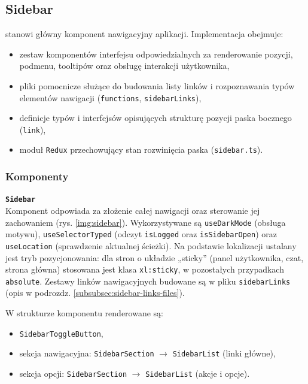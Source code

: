 
\subsection{Sidebar}
\label{subsec:sidebar-frontend}

 stanowi główny komponent nawigacyjny aplikacji.
Implementacja obejmuje:
\begin{itemize}
    \item zestaw komponentów interfejsu odpowiedzialnych za renderowanie pozycji, podmenu, tooltipów oraz obsługę
    interakcji użytkownika,
    \item pliki pomocnicze służące do budowania listy linków i rozpoznawania typów elementów nawigacji
    (\texttt{functions}, \texttt{sidebarLinks}),
    \item definicje typów i interfejsów opisujących strukturę pozycji paska bocznego (\texttt{link}),
    \item moduł \texttt{Redux} przechowujący stan rozwinięcia paska (\texttt{sidebar.ts}).
\end{itemize}

\subsubsection{Komponenty}

\textbf{\texttt{Sidebar}} \\
Komponent odpowiada za złożenie całej nawigacji oraz sterowanie jej zachowaniem (rys. \ref{img:sidebar}).
Wykorzystywane są  \texttt{useDarkMode} (obsługa motywu), \newline \texttt{useSelectorTyped}
(odczyt \texttt{isLogged} oraz \texttt{isSidebarOpen}) oraz \texttt{useLocation} (sprawdzenie aktualnej ścieżki).
Na podstawie lokalizacji ustalany jest tryb pozycjonowania: dla stron o układzie „sticky”
(panel użytkownika, czat, strona główna) stosowana jest klasa \texttt{xl:sticky}, w pozostałych przypadkach \texttt{absolute}.
Zestawy linków nawigacyjnych budowane są w pliku \texttt{sidebarLinks} (opis w podrozdz. \ref{subsubsec:sidebar-links-files}).

W strukturze komponentu renderowane są:
\begin{itemize}
    \item \texttt{SidebarToggleButton},
    \item sekcja nawigacyjna: \texttt{SidebarSection} $\rightarrow$ \texttt{SidebarList} (linki główne),
    \item sekcja opcji: \texttt{SidebarSection} $\rightarrow$ \texttt{SidebarList} (akcje i opcje).
\end{itemize}

